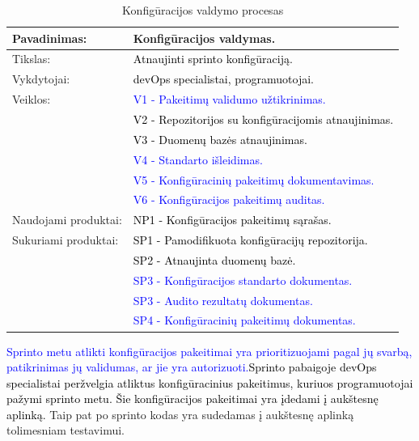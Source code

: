 \documentclass{VUMIFPSkursinis}
\begin{document}
			\begin{center}
				\begin{table}[ht]
					\caption{Konfigūracijos valdymo procesas}
					\begin{tabular}{ | l | l | }
						\hline
						Pavadinimas:         & Konfigūracijos valdymas.				\\ \hline
						Tikslas:             & \textcolor{black}{Atnaujinti sprinto konfigūraciją.}			\\ \hline
						Vykdytojai:          & \textcolor{black}{devOps specialistai, programuotojai.}			\\ \hline
						Veiklos:             	& \textcolor{blue}{V1 - Pakeitimų validumo užtikrinimas.	}		\\ \hline
																& \textcolor{black}{V2 - Repozitorijos su konfigūracijomis atnaujinimas.}	\\
																 & \textcolor{black}{V3 - Duomenų bazės atnaujinimas.	}		\\ \hline
																 & \textcolor{blue}{V4 - Standarto išleidimas.	}		\\ \hline
																 & \textcolor{blue}{V5 - Konfigūracinių pakeitimų dokumentavimas.	}		\\ \hline
																 & \textcolor{blue}{V6 - Konfigūracijos pakeitimų auditas.	}		\\ \hline
						Naudojami produktai: & \textcolor{black}{NP1 - Konfigūracijos pakeitimų sąrašas.	}	\\ \hline
						Sukuriami produktai: & \textcolor{black}{SP1 - Pamodifikuota konfigūracijų repozitorija. }	\\
																 & \textcolor{black}{SP2 - Atnaujinta duomenų bazė. }			\\ \hline
																 & \textcolor{blue}{SP3 - Konfigūracijos standarto dokumentas. }			\\ \hline
																 & \textcolor{blue}{SP3 - Audito rezultatų dokumentas. }			\\ \hline
																 & \textcolor{blue}{SP4 - Konfigūracinių pakeitimų dokumentas. }			\\ \hline
					\end{tabular}
				\end{table}
			\end{center}
				\textcolor{blue}{Sprinto metu atlikti konfigūracijos pakeitimai yra prioritizuojami pagal jų svarbą, patikrinimas jų validumas, ar jie yra autorizuoti.}\textcolor{black}{Sprinto pabaigoje devOps specialistai peržvelgia atliktus konfigūracinius pakeitimus, kuriuos programuotojai pažymi sprinto metu.
				Šie konfigūracijos pakeitimai yra įdedami į aukštesnę aplinką.} Taip pat po sprinto kodas yra sudedamas į aukštesnę aplinką tolimesniam testavimui.
\end{document}
